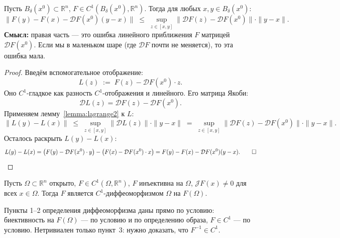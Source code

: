 \begin{lemma}
  \label{lemma:lagrange3}
  Пусть $B_\delta(x^0) \subset \mathbb{R}^n$,
  $F \in C^1(B_\delta(x^0), \mathbb{R}^n)$.
  Тогда для любых $x, y \in B_\delta(x^0)$:
  \[
    \bigl\|F(y) - F(x) - \mathcal{D}F(x^0)(y-x)\bigr\|
    \;\leq\;
    \sup_{z \in [x,y]}\bigl\|\mathcal{D}F(z) - \mathcal{D}F(x^0)\bigr\|
    \cdot \|y - x\|.
  \]
  \textbf{Смысл:} правая часть --- это ошибка линейного приближения $F$
  матрицей $\mathcal{D}F(x^0)$. Если мы в маленьком шаре (где $\mathcal{D}F$
  почти не меняется), то эта ошибка мала.
\end{lemma}

\begin{proof}
  Введём вспомогательное отображение:
  \[
    L(z) \;:=\; F(z) - \mathcal{D}F(x^0) \cdot z.
  \]
  Оно $C^1$-гладкое как разность $C^1$-отображения и линейного.
  Его матрица Якоби:
  \[
    \mathcal{D}L(z) = \mathcal{D}F(z) - \mathcal{D}F(x^0).
  \]
  Применяем лемму~\ref{lemma:lagrange2} к $L$:
  \[
    \|L(y) - L(x)\|
    \;\leq\;
    \sup_{z \in [x,y]} \|\mathcal{D}L(z)\| \cdot \|y - x\|
    \;=\;
    \sup_{z \in [x,y]} \|\mathcal{D}F(z) - \mathcal{D}F(x^0)\| \cdot \|y - x\|.
  \]
  Осталось раскрыть $L(y) - L(x)$:
  \[
    L(y) - L(x)
    = \bigl(F(y) - \mathcal{D}F(x^0) \cdot y\bigr)
      - \bigl(F(x) - \mathcal{D}F(x^0) \cdot x\bigr)
    = F(y) - F(x) - \mathcal{D}F(x^0)(y-x). \qed
  \]
\end{proof}


\begin{theorem}[О диффеоморфизме]
  \label{theorem:global}
  Пусть $\Omega \subset \mathbb{R}^n$ открыто,
  $F \in C^1(\Omega, \mathbb{R}^n)$,
  $F$ инъективна на $\Omega$,
  $\mathcal{J}F(x) \neq 0$ для всех $x \in \Omega$.
  Тогда $F$ является $C^1$-диффеоморфизмом $\Omega$ на $F(\Omega)$.
\end{theorem}

\begin{note}
  Пункты 1--2 определения диффеоморфизма даны прямо по условию:
  биективность на $F(\Omega)$ --- по условию и по определению образа,
  $F \in C^1$ --- по условию.
  Нетривиален только пункт~3: нужно доказать, что $F^{-1} \in C^1$.
\end{note}

